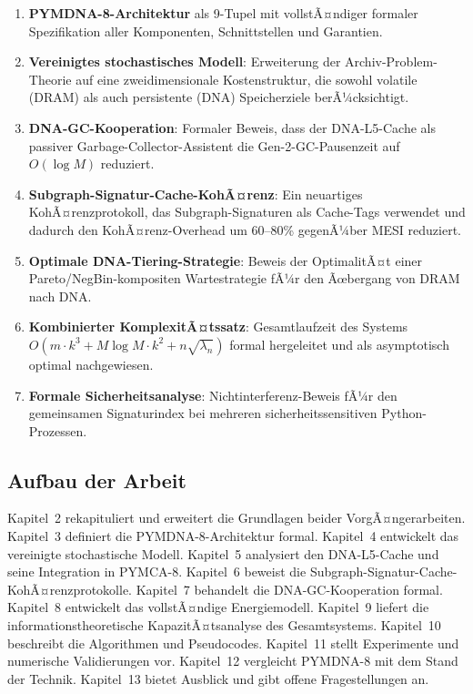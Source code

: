 ﻿\documentclass[a4paper,12pt]{article}
\theoremstyle{definition}
\begin{document}
\begin{enumerate}[noitemsep]
  \item \textbf{PYMDNA-8-Architektur} als 9-Tupel mit vollstÃ¤ndiger formaler
    Spezifikation aller Komponenten, Schnittstellen und Garantien.
  \item \textbf{Vereinigtes stochastisches Modell}: Erweiterung der Archiv-Problem-Theorie
    auf eine zweidimensionale Kostenstruktur, die sowohl volatile (DRAM) als
    auch persistente (DNA) Speicherziele berÃ¼cksichtigt.
  \item \textbf{DNA-GC-Kooperation}: Formaler Beweis, dass der DNA-L5-Cache
    als passiver Garbage-Collector-Assistent die Gen-2-GC-Pausenzeit auf
    $O(\log M)$ reduziert.
  \item \textbf{Subgraph-Signatur-Cache-KohÃ¤renz}: Ein neuartiges KohÃ¤renz\-protokoll,
    das Subgraph-Signaturen als Cache-Tags verwendet und dadurch den
    KohÃ¤renz-Overhead um 60--80\% gegenÃ¼ber MESI reduziert.
  \item \textbf{Optimale DNA-Tiering-Strategie}: Beweis der OptimalitÃ¤t
    einer Pareto/NegBin-kompositen Wartestrategie fÃ¼r den Ãœbergang von
    DRAM nach DNA.
  \item \textbf{Kombinierter KomplexitÃ¤tssatz}: Gesamtlaufzeit des Systems
    $O(m \cdot k^3 + M \log M \cdot k^2 + n \sqrt{\lambda_n})$ formal
    hergeleitet und als asymptotisch optimal nachgewiesen.
  \item \textbf{Formale Sicherheitsanalyse}: Nichtinterferenz-Beweis fÃ¼r
    den gemeinsamen Signaturindex bei mehreren sicherheitssensitiven
    Python-Prozessen.
\end{enumerate}

\subsection{Aufbau der Arbeit}

Kapitel~2 rekapituliert und erweitert die Grundlagen beider VorgÃ¤ngerarbeiten.
Kapitel~3 definiert die PYMDNA-8-Architektur formal.
Kapitel~4 entwickelt das vereinigte stochastische Modell.
Kapitel~5 analysiert den DNA-L5-Cache und seine Integration in PYMCA-8.
Kapitel~6 beweist die Subgraph-Signatur-Cache-KohÃ¤renzprotokolle.
Kapitel~7 behandelt die DNA-GC-Kooperation formal.
Kapitel~8 entwickelt das vollstÃ¤ndige Energiemodell.
Kapitel~9 liefert die informationstheoretische KapazitÃ¤tsanalyse des Gesamtsystems.
Kapitel~10 beschreibt die Algorithmen und Pseudocodes.
Kapitel~11 stellt Experimente und numerische Validierungen vor.
Kapitel~12 vergleicht PYMDNA-8 mit dem Stand der Technik.
Kapitel~13 bietet Ausblick und gibt offene Fragestellungen an.
\end{document}
